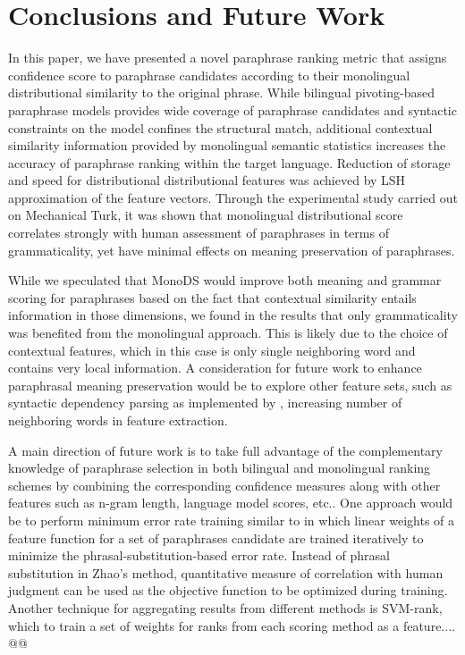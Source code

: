 \documentclass[11pt]{article}
\begin{document}








\section{Conclusions and Future Work}
In this paper, we have presented a novel paraphrase ranking metric that assigns confidence score to paraphrase candidates according to their monolingual distributional similarity to the original phrase. While bilingual pivoting-based paraphrase models provides wide coverage of paraphrase candidates and syntactic constraints on the model confines the structural match, additional contextual similarity information provided by monolingual semantic statistics increases the accuracy of paraphrase ranking within the target language. Reduction of storage and speed for distributional distributional features was achieved by LSH approximation of the feature vectors. Through the experimental study carried out on Mechanical Turk, it was shown that monolingual distributional score correlates strongly with human assessment of paraphrases in terms of grammaticality, yet have minimal effects on meaning preservation of paraphrases.

While we speculated that MonoDS would improve both meaning and grammar scoring for paraphrases based on the fact that contextual similarity entails information in those dimensions, we found in the results that only grammaticality was benefited from the monolingual approach. This is likely due to the choice of contextual features, which in this case is only single neighboring word and contains very local information. A consideration for future work to enhance paraphrasal meaning preservation would be to explore other feature sets, such as syntactic dependency parsing as implemented by \newcite{}, increasing number of neighboring words in feature extraction.

A main direction of future work is to take full advantage of the complementary knowledge of paraphrase selection in both bilingual and monolingual ranking schemes by combining the corresponding confidence measures along with other features such as n-gram length, language model scores, etc.. One approach would be to perform minimum error rate training similar to  in which linear weights of a feature function for a set of paraphrases candidate are trained iteratively to minimize the phrasal-substitution-based error rate. Instead of phrasal substitution in Zhao's method, quantitative measure of correlation with human judgment can be used as the objective function to be optimized during training. Another technique for aggregating results from different methods is SVM-rank, which          to train a set of weights for ranks from each scoring method as a feature.... @@ 
\end{document}
